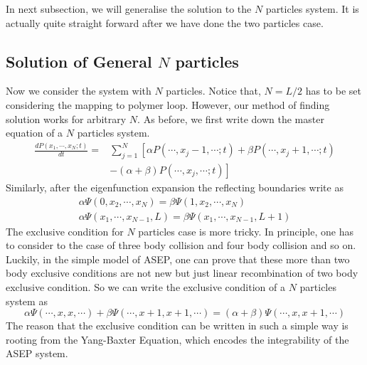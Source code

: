 In next subsection, we will generalise the solution to the $N$ particles system. It is actually quite straight forward after we have done the two particles case. 


\subsection{Solution of General $N$ particles}
\label{sub:solution_of_general_n_particles}

Now we consider the system with $N$ particles. Notice that, $N=L/2$ has to be set considering the mapping to polymer loop. However, our method of finding solution works for arbitrary $N$. As before, we first write down the master equation of a $N$ particles system. 
\begin{equation}
    \begin{aligned}
        \label{eq:masterEqN} \frac{d P(x_1, \cdots, x_N; t)}{dt} = & \sum_{j=1}^N \left[\alpha P(\cdots,x_j-1,\cdots;t) + \beta P(\cdots, x_j+1, \cdots;t)\right. \\ 
        & \left.- (\alpha+\beta)P(\cdots, x_j, \cdots; t)\right]
    \end{aligned}
\end{equation}
Similarly, after the eigenfunction expansion the reflecting boundaries write as
\begin{subequations}
    \label{eq:boundaries-N-particles}
    \begin{align}
        \alpha \Psi(0,x_2,\cdots,x_N) = \beta \Psi(1, x_2,\cdots, x_N) \\
        \alpha \Psi(x_1,\cdots, x_{N-1}, L) = \beta \Psi(x_1,\cdots, x_{N-1}, L+1)
    \end{align}
\end{subequations}
The exclusive condition for $N$ particles case is more tricky. In principle, one has to consider to the case of three body collision and four body collision and so on. Luckily, in the simple model of ASEP, one can prove that these more than two body exclusive conditions are not new but just linear recombination of two body exclusive condition. So we can write the exclusive condition of a $N$ particles system as 
\begin{equation}
    \label{eq:exclusionConditionN}
    \alpha \Psi(\cdots,x, x,\cdots) + \beta \Psi(\cdots, x+1, x+1, \cdots) = (\alpha + \beta) \Psi(\cdots, x, x+1, \cdots)
\end{equation}
The reason that the exclusive condition can be written in such a simple way is rooting from the Yang-Baxter Equation, which encodes the integrability of the ASEP system.

